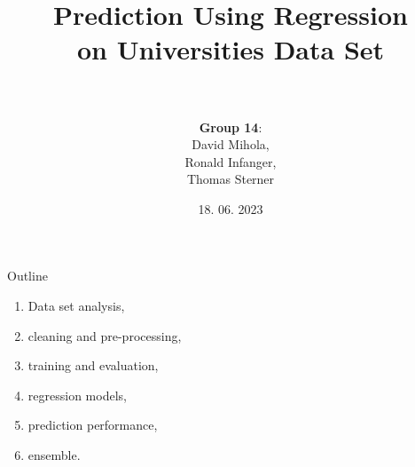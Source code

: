 \documentclass{beamer} %
\title[Prediction Using Regression on Universities Data Set]{Prediction Using Regression\\on Universities Data Set\\\normalsize \\}
\author{\textbf{Group 14}: \\David Mihola, \\Ronald Infanger, \\Thomas Sterner}
\date{18. 06. 2023}
\begin{document}
\begin{frame}
  \maketitle
\end{frame}

\begin{frame}{Outline}
  \vspace{-1cm}
  \begin{enumerate}
      \item Data set analysis,
      \item cleaning and pre-processing,
      \item training and evaluation,
      \item regression models,
      \item prediction performance,
      \item ensemble.
  \end{enumerate}
\end{frame}
\end{document}
